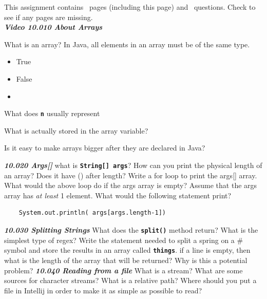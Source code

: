\documentclass[letterpaper,11pt]{exam}
\newcommand{\videoheading}[1]{\Large\textbf{\textit{#1}}}
\begin{document}
This assignment contains \numpages\ pages (including this page) and
\numquestions\ questions.  Check to see if any pages are missing.\\
\videoheading{Video 10.010 About Arrays}
\begin{questions}

\question What is an array?
\vspace{1.5cm}
\question In Java, all elements in an array must be of the same type.
\begin{itemize}
  \item  True
  \item  False
  \item 
\end{itemize}
\question What does \texttt{\textbf{n}} usually represent

\question What is actually stored in the array variable?

\question Is it easy to make arrays bigger after they are declared in Java?

\videoheading{10.020 Args[]}
\question what is \texttt{\textbf{String[] args}}?
\vspace*{1cm}
\question How can you print the physical length of an array?  Does it have () after length?
\vspace{1cm}
\question Write a for loop to print the args[] array.
\vspace{4cm}
\question What would the above loop do if the args array is empty?
\question Assume that the args array has \textit{at least} 1 element.  What would the following statement print?
\begin{verbatim}
    System.out.println( args[args.length-1])
\end{verbatim}

\videoheading{10.030 Splitting Strings}
\question What does the \texttt{\textbf{split()}} method return?
\question What is the simplest type of regex?
\question Write the statement needed to split a spring on a # symbol and store the results in an array called \texttt{\textbf{things}}.
\vspace{1cm}
\question if a line is empty, then what is the length of the array that will be returned?  Why is this a potential problem?
\vspace{1cm}
\videoheading{10.040 Reading from a file}
\question What is a stream?  What are some sources for character streams?
\question What is a relative path?
\question Where should you put a file in Intellij in order to make it as simple as possible to read?


\end{questions}
\end{document}
